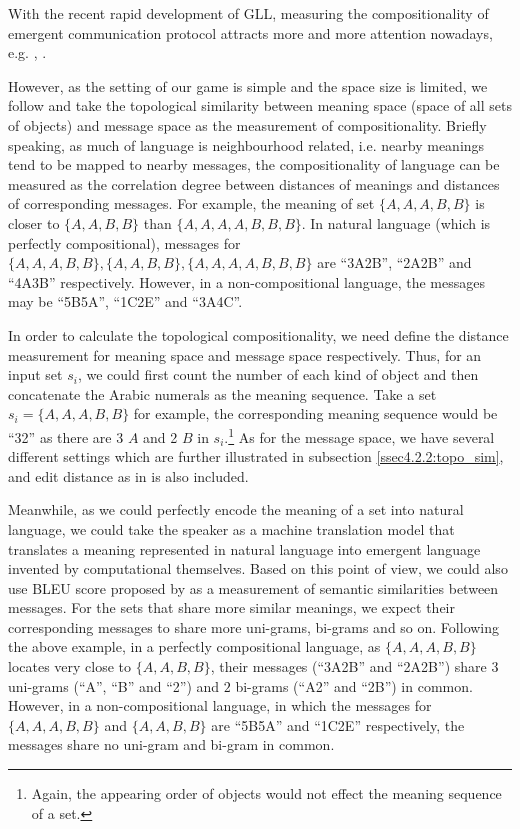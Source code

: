 With the recent rapid development of GLL, measuring the compositionality of emergent communication protocol attracts more and more attention nowadays, e.g. \cite{andreas2019measuring}, \cite{lowe2019pitfalls}.

However, as the setting of our game is simple and the space size is limited, we follow \cite{brighton2006understanding} and take the topological similarity between meaning space (space of all sets of objects) and message space as the measurement of compositionality. Briefly speaking, as much of language is neighbourhood related, i.e. nearby meanings tend to be mapped to nearby messages, the compositionality of language can be measured as the correlation degree between distances of meanings and distances of corresponding messages. For example, the meaning of set $\{A,A,A,B,B\}$ is closer to $\{A,A,B,B\}$ than $\{A,A,A,A,B,B,B\}$. In natural language (which is perfectly compositional), messages for  $\{A,A,A,B,B\}, \{A,A,B,B\}, \{A,A,A,A,B,B,B\}$ are ``3A2B'', ``2A2B'' and ``4A3B'' respectively. However, in a non-compositional language, the messages may be ``5B5A'', ``1C2E'' and ``3A4C''.

In order to calculate the topological compositionality, we need define the distance measurement for meaning space and message space respectively. Thus, for an input set $s_i$, we could first count the number of each kind of object and then concatenate the Arabic numerals as the meaning sequence. Take a set $s_i=\{A, A, A, B, B\}$ for example, the corresponding meaning sequence would be ``32'' as there are 3 $A$ and 2 $B$ in $s_i$.\footnote{Again, the appearing order of objects would not effect the meaning sequence of a set.} As for the message space, we have several different settings which are further illustrated in subsection \ref{ssec4.2.2:topo_sim}, and edit distance as in \cite{brighton2006understanding} is also included.

Meanwhile, as we could perfectly encode the meaning of a set into natural language, we could take the speaker as a machine translation model that translates a meaning represented in natural language into emergent language invented by computational themselves. Based on this point of view, we could also use BLEU score proposed by \cite{papineni2002bleu} as a measurement of semantic similarities between messages. For the sets that share more similar meanings, we expect their corresponding messages to share more uni-grams, bi-grams and so on. Following the above example, in a perfectly compositional language, as $\{A,A,A,B,B\}$ locates very close to $\{A,A,B,B\}$, their messages (``3A2B'' and ``2A2B'') share $3$ uni-grams (``A'', ``B'' and ``2'') and $2$ bi-grams (``A2'' and ``2B'') in common. However, in a non-compositional language, in which the messages for $\{A,A,A,B,B\}$ and $\{A,A,B,B\}$ are ``5B5A'' and ``1C2E'' respectively, the messages share no uni-gram and bi-gram in common.

